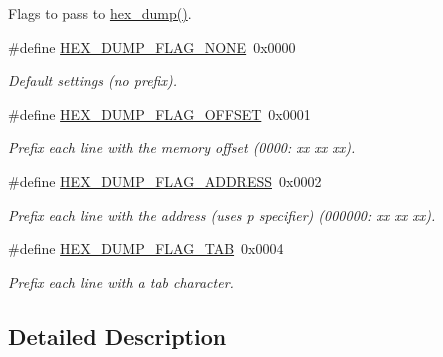 Flags to pass to \hyperlink{group__util_gaa321236a0cb6f4e0dad592fdf1b550d2}{hex\+\_\+dump()}. \begin{DoxyCompactItemize}
\item 
\mbox{\label{group__hal_gae60f842ae8bc3cc952cdeece611670d5}} 
\#define \hyperlink{group__hal_gae60f842ae8bc3cc952cdeece611670d5}{H\+E\+X\+\_\+\+D\+U\+M\+P\+\_\+\+F\+L\+A\+G\+\_\+\+N\+O\+NE}~0x0000
\begin{DoxyCompactList}\small\item\em Default settings (no prefix). \end{DoxyCompactList}\item 
\mbox{\label{group__hal_gaec79525addd1a70fda55b1ea11534832}} 
\#define \hyperlink{group__hal_gaec79525addd1a70fda55b1ea11534832}{H\+E\+X\+\_\+\+D\+U\+M\+P\+\_\+\+F\+L\+A\+G\+\_\+\+O\+F\+F\+S\+ET}~0x0001
\begin{DoxyCompactList}\small\item\em Prefix each line with the memory offset (0000\+: xx xx xx). \end{DoxyCompactList}\item 
\mbox{\label{group__hal_ga967137c51c026d68d03d1668402ec12b}} 
\#define \hyperlink{group__hal_ga967137c51c026d68d03d1668402ec12b}{H\+E\+X\+\_\+\+D\+U\+M\+P\+\_\+\+F\+L\+A\+G\+\_\+\+A\+D\+D\+R\+E\+SS}~0x0002
\begin{DoxyCompactList}\small\item\em Prefix each line with the address (uses p specifier) (000000\+: xx xx xx). \end{DoxyCompactList}\item 
\mbox{\label{group__hal_ga696f6553e33cbd20eda34e220ec9939a}} 
\#define \hyperlink{group__hal_ga696f6553e33cbd20eda34e220ec9939a}{H\+E\+X\+\_\+\+D\+U\+M\+P\+\_\+\+F\+L\+A\+G\+\_\+\+T\+AB}~0x0004
\begin{DoxyCompactList}\small\item\em Prefix each line with a tab character. \end{DoxyCompactList}\end{DoxyCompactItemize}


\subsection{Detailed Description}


